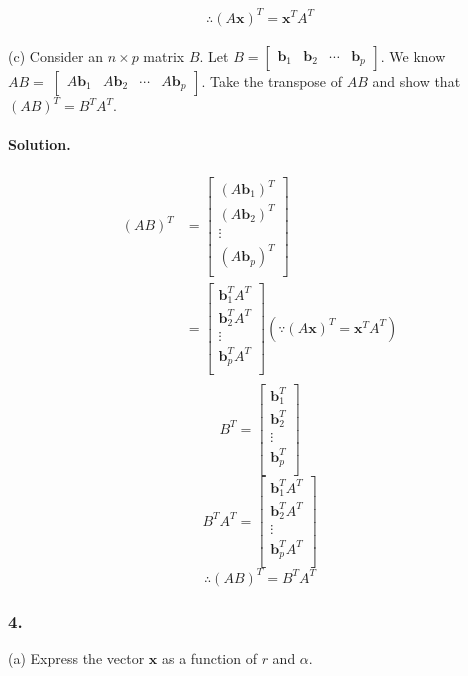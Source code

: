 $$\therefore (A\mathbf{x})^T = \mathbf{x}^T A^T$$\\
\newpage
(c) Consider an $n\times p$ matrix $B$.
Let $B=\begin{bmatrix}
    \mathbf{b}_1 & \mathbf{b}_2 & \cdots & \mathbf{b}_p
\end{bmatrix}$.
We know $AB=􏰀\begin{bmatrix}
    A\mathbf{b}_1 & A\mathbf{b}_2 & \cdots & A\mathbf{b}_p
\end{bmatrix}$.
Take the transpose of $AB$ and show that $(AB)^T = B^T A^T$.
\paragraph{Solution.}
\begin{align*}
    (AB)^T &= \begin{bmatrix}
        (A\mathbf{b}_1)^T\\
        (A\mathbf{b}_2)^T\\
        \vdots\\
        (A\mathbf{b}_p)^T\\
    \end{bmatrix}\\
    &= \begin{bmatrix}
        \mathbf{b}_1^TA^T\\
        \mathbf{b}_2^TA^T\\
        \vdots\\
        \mathbf{b}_p^TA^T\\
    \end{bmatrix} (\because (A\mathbf{x})^T = \mathbf{x}^T A^T)\\
\end{align*}
$$B^T = \begin{bmatrix}
    \mathbf{b}_1^T\\
    \mathbf{b}_2^T\\
    \vdots\\
    \mathbf{b}_p^T\\
\end{bmatrix}$$
$$B^TA^T = \begin{bmatrix}
    \mathbf{b}_1^TA^T\\
    \mathbf{b}_2^TA^T\\
    \vdots\\
    \mathbf{b}_p^TA^T\\
\end{bmatrix}$$
$$\therefore (AB)^T = B^TA^T$$
\newpage
\subsubsection{4.}
(a) Express the vector $\mathbf{x}$ as a function of $r$ and $\alpha$.
